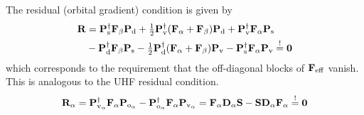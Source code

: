 \documentclass[11pt]{article}
\begin{document}
The residual (orbital gradient) condition is given by
\begin{align}
  \mathbf{R}
&=
  \mathbf{P}_{\mathrm{s}}^\dagger
  \mathbf{F}_{\beta }
  \mathbf{P}_{\mathrm{d}}
+
  \tfrac{1}{2}
  \mathbf{P}_{\mathrm{v}}^\dagger
  (
    \mathbf{F}_{\alpha }
  +
    \mathbf{F}_{\beta }
  )
  \mathbf{P}_{\mathrm{d}}
+
  \mathbf{P}_{\mathrm{v}}^\dagger
  \mathbf{F}_{\alpha }
  \mathbf{P}_{\mathrm{s}}
\\
&-
  \mathbf{P}_{\mathrm{d}}^\dagger
  \mathbf{F}_{\beta }
  \mathbf{P}_{\mathrm{s}}
-
  \tfrac{1}{2}
  \mathbf{P}_{\mathrm{d}}^\dagger
  (
    \mathbf{F}_{\alpha }
  +
    \mathbf{F}_{\beta }
  )
  \mathbf{P}_{\mathrm{v}}
-
  \mathbf{P}_{\mathrm{s}}^\dagger
  \mathbf{F}_{\alpha }
  \mathbf{P}_{\mathrm{v}}
\overset{!}{=}
  \mathbf{0}
\end{align}
which corresponds to the requirement that the off-diagonal blocks of $\mathbf{F}_{\mathrm{eff}}$ vanish.
This is analogous to the UHF residual condition.
\begin{align}
  \mathbf{R}_{\alpha }
=
  \mathbf{P}_{\mathrm{v}_{\alpha }}^\dagger
  \mathbf{F}_{\alpha }
  \mathbf{P}_{\mathrm{o}_{\alpha }}
-
  \mathbf{P}_{\mathrm{o}_{\alpha }}^\dagger
  \mathbf{F}_{\alpha }
  \mathbf{P}_{\mathrm{v}_{\alpha }}
=
  \mathbf{F}_{\alpha }
  \mathbf{D}_{\alpha }
  \mathbf{S}
-
  \mathbf{S}
  \mathbf{D}_{\alpha }
  \mathbf{F}_{\alpha }
\overset{!}{=}
  \mathbf{0}
\end{align}
\end{document}
